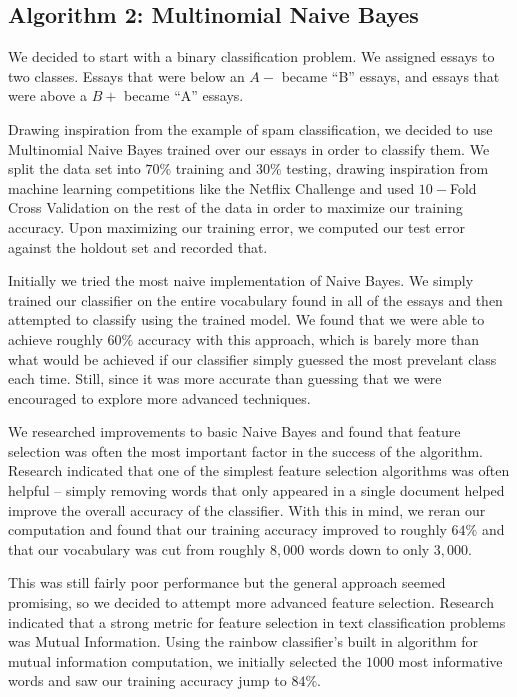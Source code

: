 \documentclass[11pt,acticle]{scrartcl}
\begin{document}
\begin{multicols}{2}
\subsection{Algorithm 2: Multinomial Naive Bayes}

We decided to start with a binary classification problem. We assigned essays to two classes. Essays that were below an $A-$ became ``B'' essays, and essays that were above a $B+$ became ``A'' essays. 

Drawing inspiration from the example of spam classification, we decided to use Multinomial Naive Bayes trained over our essays in order to classify them. We split the data set into $70\%$ training and $30\%$ testing, drawing inspiration from machine learning competitions like the Netflix Challenge and used $10-$Fold Cross Validation on the rest of the data in order to maximize our training accuracy. Upon maximizing our training error, we computed our test error against the holdout set and recorded that.

Initially we tried the most naive implementation of Naive Bayes. We simply trained our classifier on the entire vocabulary found in all of the essays and then attempted to classify using the trained model. We found that we were able to achieve roughly $60\%$ accuracy with this approach, which is barely more than what would be achieved if our classifier simply guessed the most prevelant class each time. Still, since it was more accurate than guessing that we were encouraged to explore more advanced techniques.

We researched improvements to basic Naive Bayes and found that feature selection was often the most important factor in the success of the algorithm. Research indicated that one of the simplest feature selection algorithms was often helpful -- simply removing words that only appeared in a single document helped improve the overall accuracy of the classifier. With this in mind, we reran our computation and found that our training accuracy improved to roughly $64\%$ and that our vocabulary was cut from roughly $8,000$ words down to only $3,000$.

This was still fairly poor performance but the general approach seemed promising, so we decided to attempt more advanced feature selection. Research indicated that a strong metric for feature selection in text classification problems was Mutual Information. Using the rainbow classifier's built in algorithm for mutual information computation, we initially selected the $1000$ most informative words and saw our training accuracy jump to $84\%$.

\end{multicols}
\end{document}
